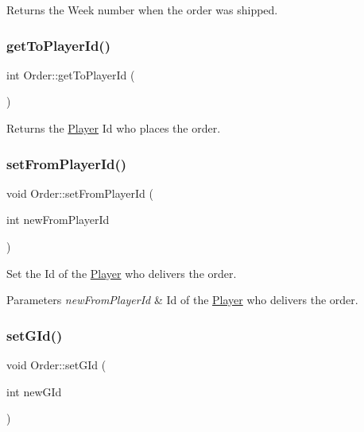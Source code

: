Returns the Week number when the order was shipped. \mbox{\label{classOrder_a212e8294656ab9582dbca89de2e1e4c9}} 
\subsubsection{\texorpdfstring{get\+To\+Player\+Id()}{getToPlayerId()}}
{\footnotesize\ttfamily int Order\+::get\+To\+Player\+Id (\begin{DoxyParamCaption}{ }\end{DoxyParamCaption})}

Returns the \hyperlink{classPlayer}{Player} Id who places the order. \mbox{\label{classOrder_aad96c2cebb1032e899be28bd09610cfa}} 
\subsubsection{\texorpdfstring{set\+From\+Player\+Id()}{setFromPlayerId()}}
{\footnotesize\ttfamily void Order\+::set\+From\+Player\+Id (\begin{DoxyParamCaption}\item[{int}]{new\+From\+Player\+Id }\end{DoxyParamCaption})}

Set the Id of the \hyperlink{classPlayer}{Player} who delivers the order. 
\begin{DoxyParams}{Parameters}
{\em new\+From\+Player\+Id} & Id of the \hyperlink{classPlayer}{Player} who delivers the order. \\
\hline
\end{DoxyParams}
\mbox{\label{classOrder_a9cdffc1001883592ab2bddc4526a29d5}} 
\subsubsection{\texorpdfstring{set\+G\+Id()}{setGId()}}
{\footnotesize\ttfamily void Order\+::set\+G\+Id (\begin{DoxyParamCaption}\item[{int}]{new\+G\+Id }\end{DoxyParamCaption})}

